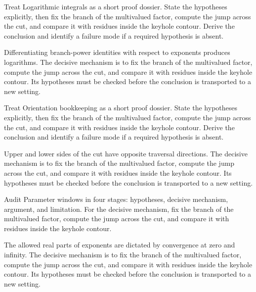 \begin{problem}\label{prob:iv21-problem-06}
Treat Logarithmic integrals as a short proof dossier. State the hypotheses explicitly, then fix the branch of the multivalued factor, compute the jump across the cut, and compare it with residues inside the keyhole contour. Derive the conclusion and identify a failure mode if a required hypothesis is absent.
\end{problem}
\begin{solution}
Differentiating branch-power identities with respect to exponents produces logarithms. The decisive mechanism is to fix the branch of the multivalued factor, compute the jump across the cut, and compare it with residues inside the keyhole contour. Its hypotheses must be checked before the conclusion is transported to a new setting.
\end{solution}

\begin{problem}\label{prob:iv21-problem-07}
Treat Orientation bookkeeping as a short proof dossier. State the hypotheses explicitly, then fix the branch of the multivalued factor, compute the jump across the cut, and compare it with residues inside the keyhole contour. Derive the conclusion and identify a failure mode if a required hypothesis is absent.
\end{problem}
\begin{solution}
Upper and lower sides of the cut have opposite traversal directions. The decisive mechanism is to fix the branch of the multivalued factor, compute the jump across the cut, and compare it with residues inside the keyhole contour. Its hypotheses must be checked before the conclusion is transported to a new setting.
\end{solution}

\begin{problem}\label{prob:iv21-problem-08}
Audit Parameter windows in four stages: hypotheses, decisive mechanism, argument, and limitation. For the decisive mechanism, fix the branch of the multivalued factor, compute the jump across the cut, and compare it with residues inside the keyhole contour.
\end{problem}
\begin{solution}
The allowed real parts of exponents are dictated by convergence at zero and infinity. The decisive mechanism is to fix the branch of the multivalued factor, compute the jump across the cut, and compare it with residues inside the keyhole contour. Its hypotheses must be checked before the conclusion is transported to a new setting.
\end{solution}

